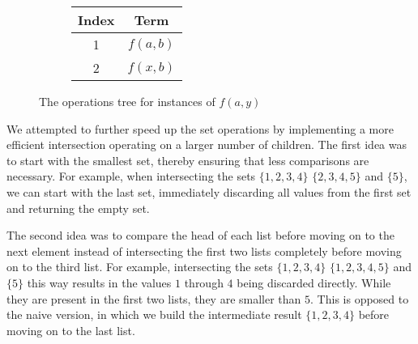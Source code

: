\begin{figure}[h]
  \begin{subfigure}{0.2\textwidth}
    \centering
    \begin{tabular} { c|c }
      Index & Term\\
      \hline
      1 & $f(a,b)$\\
      2 & $f(x,b)$
    \end{tabular}
  \end{subfigure}
  \begin{subfigure}{0.5\textwidth}
    \centering
{}
  \end{subfigure}
  \begin{subfigure}{0.25\textwidth}
    \centering
{}
  \end{subfigure}
  \caption{The operations tree for instances of $f(a,y)$} \label{intersect}
\end{figure}

We attempted to further speed up the set operations by implementing a more efficient intersection operating on a larger number of children. The first idea was to start with the smallest set, thereby ensuring that less comparisons are necessary. For example, when intersecting the sets $\{1,2,3,4\}$ $\{2,3,4,5\}$ and $\{5\}$, we can start with the last set, immediately discarding all values from the first set and returning the empty set.

The second idea was to compare the head of each list before moving on to the next element instead of intersecting the first two lists completely before moving on to the third list. For example, intersecting the sets $\{1,2,3,4\}$ $\{1,2,3,4,5\}$ and $\{5\}$ this way results in the values $1$ through $4$ being discarded directly. While they are present in the first two lists, they are smaller than $5$. This is opposed to the naive version, in which we build the intermediate result $\{1,2,3,4\}$ before moving on to the last list.

